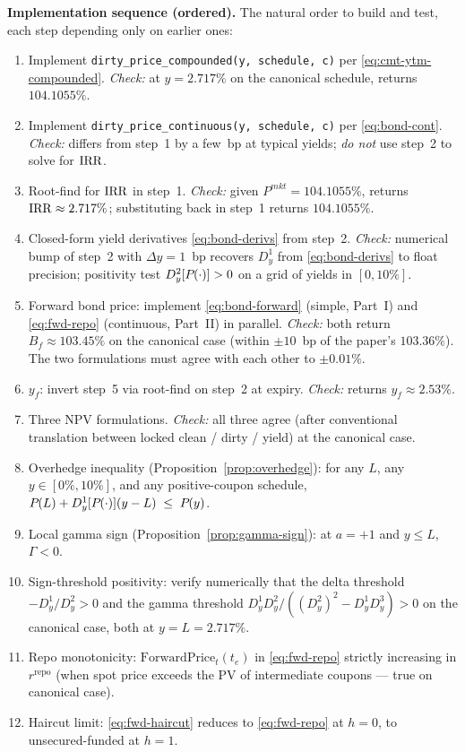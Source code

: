 \documentclass[11pt,a4paper]{article}
\newcommand{\FwdP}{\mathrm{ForwardPrice}}
\newcommand{\Bf}{B_f}
\newcommand{\rrepo}{r^{\mathrm{repo}}}
\newcommand{\dD}[1]{D_{y}^{#1}}
\begin{document}
\begin{validation}
\textbf{Implementation sequence (ordered).}
The natural order to build and test, each step depending only on
earlier ones:
\begin{enumerate}[noitemsep]
\item Implement \texttt{dirty\_price\_compounded(y, schedule, c)} per
      \eqref{eq:cmt-ytm-compounded}. \emph{Check:} at
      $y = 2.717\%$ on the canonical schedule, returns $104.1055\%$.
\item Implement \texttt{dirty\_price\_continuous(y, schedule, c)} per
      \eqref{eq:bond-cont}. \emph{Check:} differs from step~1 by a
      few~bp at typical yields; \emph{do not} use step~2 to solve
      for $\mathrm{IRR}$.
\item Root-find for $\mathrm{IRR}$ in step~1. \emph{Check:} given
      $P^{mkt} = 104.1055\%$, returns $\mathrm{IRR} \approx 2.717\%$;
      substituting back in step~1 returns $104.1055\%$.
\item Closed-form yield derivatives \eqref{eq:bond-derivs} from
      step~2. \emph{Check:} numerical bump of step~2 with
      $\Delta y = 1$~bp recovers $\dD{1}$ from \eqref{eq:bond-derivs}
      to float precision; positivity test
      $\dD{2}[\Bond{}{\cdot}] > 0$ on a grid of yields in $[0, 10\%]$.
\item Forward bond price: implement \eqref{eq:bond-forward} (simple,
      Part~I) and \eqref{eq:fwd-repo} (continuous, Part~II) in
      parallel. \emph{Check:} both return $\Bf \approx 103.45\%$ on
      the canonical case (within $\pm 10$~bp of the paper's
      $103.36\%$). The two formulations must agree with each other
      to $\pm 0.01\%$.
\item $y_f$: invert step~5 via root-find on step~2 at expiry.
      \emph{Check:} returns $y_f \approx 2.53\%$.
\item Three NPV formulations. \emph{Check:} all three agree (after
      conventional translation between locked clean / dirty / yield)
      at the canonical case.
\item Overhedge inequality (Proposition~\ref{prop:overhedge}): for
      any $L$, any $y \in [0\%, 10\%]$, and any positive-coupon
      schedule,
      $\Bond{}{L} + \dD{1}[\Bond{}{\cdot}](y - L) \;\le\; \Bond{}{y}$.
\item Local gamma sign (Proposition~\ref{prop:gamma-sign}): at
      $a = +1$ and $y \le L$, $\Gamma < 0$.
\item Sign-threshold positivity: verify numerically that the
      delta threshold $-\dD{1}/\dD{2} > 0$ and the gamma threshold
      $\dD{1}\dD{2}/((\dD{2})^2 - \dD{1}\dD{3}) > 0$ on the canonical
      case, both at $y = L = 2.717\%$.
\item Repo monotonicity: $\FwdP_t(t_e)$ in \eqref{eq:fwd-repo}
      strictly increasing in $\rrepo$ (when spot price exceeds the
      PV of intermediate coupons --- true on canonical case).
\item Haircut limit: \eqref{eq:fwd-haircut} reduces to
      \eqref{eq:fwd-repo} at $h=0$, to unsecured-funded at $h=1$.
\end{enumerate}


\end{validation}
\end{document}
